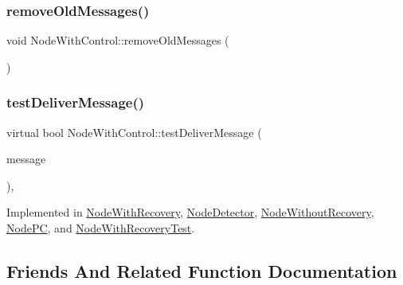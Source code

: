 \mbox{\label{class_node_with_control_add681efe156d989a717d2cd979f5ac9f}} 
\subsubsection{\texorpdfstring{remove\+Old\+Messages()}{removeOldMessages()}}
{\footnotesize\ttfamily void Node\+With\+Control\+::remove\+Old\+Messages (\begin{DoxyParamCaption}{ }\end{DoxyParamCaption})\hspace{0.3cm}{\ttfamily [protected]}}

\mbox{\label{class_node_with_control_a84df0beabbaed80e7da017d592480515}} 
\subsubsection{\texorpdfstring{test\+Deliver\+Message()}{testDeliverMessage()}}
{\footnotesize\ttfamily virtual bool Node\+With\+Control\+::test\+Deliver\+Message (\begin{DoxyParamCaption}\item[{const \hyperlink{structures_8h_a7e7bdc1d2fff8a9436f2f352b2711ed6}{message\+Info} \&}]{message }\end{DoxyParamCaption})\hspace{0.3cm}{\ttfamily [protected]}, {}}



Implemented in \hyperlink{class_node_with_recovery_aec147b3723b3dab00f9610453ba8daba}{Node\+With\+Recovery}, \hyperlink{class_node_detector_a51e7dccd54e94bbe937752ca39dfdba4}{Node\+Detector}, \hyperlink{class_node_without_recovery_a8cf83ec6d0af26e385dcde0bc03f5b6d}{Node\+Without\+Recovery}, \hyperlink{class_node_p_c_a54731196935596e0c6f094a5a8420134}{Node\+PC}, and \hyperlink{class_node_with_recovery_test_af9b78d0ed4fefb97e2f54c9279aa4655}{Node\+With\+Recovery\+Test}.



\subsection{Friends And Related Function Documentation}
\mbox{\label{class_node_with_control_a129f65b6976377739eb6231b6962985e}} 
